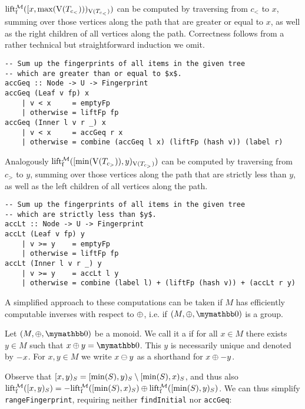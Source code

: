 $\operatorname{lift_{\operatorname{f}}^{\mathcal{M}}}([{x},{\max(\operatorname{V}(T_{c_{<}}))})_{\operatorname{V}(T_{c_{<}})})$ can be computed by traversing from $c_{<}$ to $x$, summing over those vertices along the path that are greater or equal to $x$, as well as the right children of all vertices along the path. Correctness follows from a rather technical but straightforward induction we omit.

\begin{verbatim}
-- Sum up the fingerprints of all items in the given tree
-- which are greater than or equal to $x$.
accGeq :: Node -> U -> Fingerprint
accGeq (Leaf v fp) x
    | v < x     = emptyFp
    | otherwise = liftFp fp
accGeq (Inner l v r _) x
    | v < x     = accGeq r x
    | otherwise = combine (accGeq l x) (liftFp (hash v)) (label r)
\end{verbatim}

Analogously $\operatorname{lift_{\operatorname{f}}^{\mathcal{M}}}([{\min(\operatorname{V}(T_{c_{>}}))},{y})_{\operatorname{V}(T_{c_{>}})})$ can be computed by traversing from $c_{>}$ to $y$, summing over those vertices along the path that are strictly less than $y$, as well as the left children of all vertices along the path.

\begin{verbatim}
-- Sum up the fingerprints of all items in the given tree
-- which are strictly less than $y$.
accLt :: Node -> U -> Fingerprint
accLt (Leaf v fp) y
    | v >= y    = emptyFp
    | otherwise = liftFp fp
accLt (Inner l v r _) y
    | v >= y    = accLt l y
    | otherwise = combine (label l) + (liftFp (hash v)) + (accLt r y)
\end{verbatim}

A simplified approach to these computations can be taken if $M$ has efficiently computable inverses with respect to $\oplus$, i.e. if $(M, \groupaddsym, \neutraladd)$ is a group.

\begin{definition}
Let $(M, \groupaddsym, \neutraladd)$ be a monoid.
We call it a  if for all $x \in M$ there exists $y \in M$ such that $\groupadd{x}{y} = \neutraladd$.
This $y$ is necessarily unique and denoted by $-{x}$.
For $x, y \in M$ we write ${x} \ominus {y}$ as a shorthand for ${x} \oplus {-{y}}$.
\end{definition}

Observe that $[{x},{y})_{S} = [{\min(S)},{y})_{S} \setminus [{\min(S)},{x})_{S}$, and thus also $\operatorname{lift_{\operatorname{f}}^{\mathcal{M}}}([{x},{y})_{S}) = {-{\operatorname{lift_{\operatorname{f}}^{\mathcal{M}}}([{\min(S)},{x})_{S})}} \oplus {\operatorname{lift_{\operatorname{f}}^{\mathcal{M}}}([{\min(S)},{y})_{S})}$. We can thus simplify \texttt{rangeFingerprint}, requiring neither \texttt{findInitial} nor \texttt{accGeq}:


